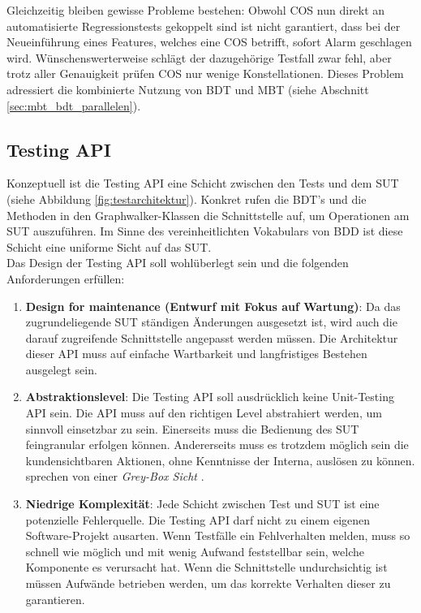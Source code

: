 Gleichzeitig bleiben gewisse Probleme bestehen: Obwohl \Gls{COS} nun direkt an automatisierte Regressionstests gekoppelt sind ist nicht garantiert, dass bei der Neueinführung eines Features, welches eine \Gls{COS} betrifft, sofort Alarm geschlagen wird. Wünschenswerterweise schlägt der dazugehörige Testfall zwar fehl, aber trotz aller Genauigkeit prüfen \Gls{COS} nur wenige Konstellationen. Dieses Problem adressiert die kombinierte Nutzung von \Gls{BDT} und \Gls{MBT} (siehe Abschnitt \ref{sec:mbt_bdt_parallelen}).

\subsection{Testing API}
\label{sec:testing_api}

Konzeptuell ist die Testing API eine Schicht zwischen den Tests und dem \Gls{SUT} (siehe Abbildung \ref{fig:testarchitektur}). Konkret rufen die \Gls{BDT}'s und die Methoden in den Graphwalker-Klassen die Schnittstelle auf, um Operationen am \Gls{SUT} auszuführen. Im Sinne des vereinheitlichten Vokabulars von \Gls{BDD} ist diese Schicht eine uniforme Sicht auf das \Gls{SUT}.\\
Das Design der Testing API soll wohlüberlegt sein und die folgenden Anforderungen erfüllen:

\begin{enumerate}
\item \textbf{Design for maintenance (Entwurf mit Fokus auf Wartung)}: Da das zugrundeliegende \Gls{SUT} ständigen Änderungen ausgesetzt ist, wird auch die darauf zugreifende Schnittstelle angepasst werden müssen. Die Architektur dieser API muss auf einfache Wartbarkeit und langfristiges Bestehen ausgelegt sein.
\item \textbf{Abstraktionslevel}: Die Testing API soll ausdrücklich keine Unit-Testing API sein. Die API muss auf den richtigen Level abstrahiert werden, um sinnvoll einsetzbar zu sein. Einerseits muss die Bedienung des \Gls{SUT} feingranular erfolgen können. Andererseits muss es trotzdem möglich sein die kundensichtbaren Aktionen, ohne Kenntnisse der Interna, auslösen zu können. \citeauthor{tyler_black-box_2004} sprechen von einer \textit{Grey-Box Sicht} \cite{tyler_black-box_2004}.
\item \textbf{Niedrige Komplexität}: Jede Schicht zwischen Test und \Gls{SUT} ist eine potenzielle Fehlerquelle. Die Testing API darf nicht zu einem eigenen Software-Projekt ausarten. Wenn Testfälle ein Fehlverhalten melden, muss so schnell wie möglich und mit wenig Aufwand feststellbar sein, welche Komponente es verursacht hat. Wenn die Schnittstelle undurchsichtig ist müssen Aufwände betrieben werden, um das korrekte Verhalten dieser zu garantieren.
\end{enumerate}

